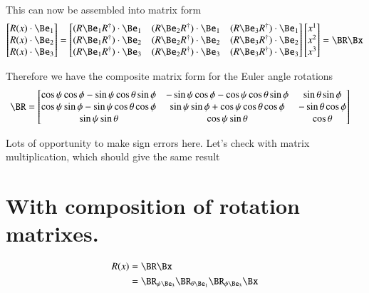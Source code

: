 \documentclass{article}
\begin{document}
This can now be assembled into matrix form
\begin{align*}
\begin{bmatrix}
R(x) \cdot \Be_1 \\
R(x) \cdot \Be_2 \\
R(x) \cdot \Be_3
\end{bmatrix}
=
\begin{bmatrix}
(R \Be_1 R^\dagger) \cdot \Be_1 & (R \Be_2 R^\dagger) \cdot \Be_1 & (R \Be_3 R^\dagger) \cdot \Be_1 \\
(R \Be_1 R^\dagger) \cdot \Be_2 & (R \Be_2 R^\dagger) \cdot \Be_2 & (R \Be_3 R^\dagger) \cdot \Be_2 \\
(R \Be_1 R^\dagger) \cdot \Be_3 & (R \Be_2 R^\dagger) \cdot \Be_3 & (R \Be_3 R^\dagger) \cdot \Be_3 \\
\end{bmatrix}
\begin{bmatrix}
x^1 \\
x^2 \\
x^3 \\
\end{bmatrix} = \BR \Bx
\end{align*}

Therefore we have the composite matrix form for the Euler angle rotations
\begin{align*}
\BR &=
\begin{bmatrix}
\cos\psi \cos\phi - \sin\psi \cos\theta \sin\phi   & -\sin\psi \cos\phi - \cos\psi \cos\theta \sin\phi & \sin\theta \sin\phi \\
\cos\psi \sin\phi - \sin\psi \cos\theta \cos\phi   & \sin\psi \sin\phi + \cos\psi \cos\theta \cos\phi & -\sin\theta \cos\phi \\
\sin\psi \sin\theta                                & \cos\psi \sin\theta                              & \cos\theta \\
\end{bmatrix}
\end{align*}

Lots of opportunity to make sign errors here.  Let's check with matrix multiplication, which should give the same result

\section{ With composition of rotation matrixes. }

\begin{align*}
R(x) &= \BR \Bx \\
&= 
\BR_{\psi \Be_3}
\BR_{\theta \Be_1}
\BR_{\phi \Be_3} \Bx \\
\end{align*}
\end{document}
